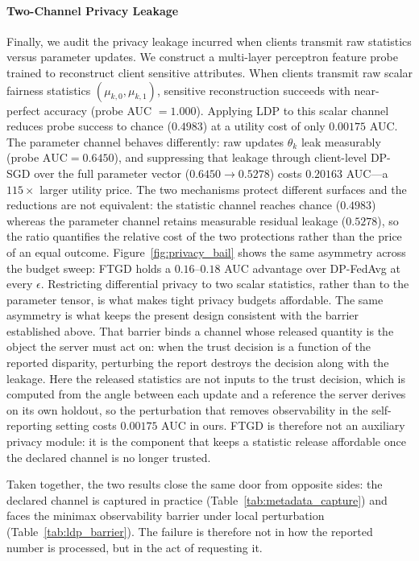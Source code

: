 \paragraph{Two-Channel Privacy Leakage}
Finally, we audit the privacy leakage incurred when clients transmit raw statistics versus parameter updates. We construct a multi-layer perceptron feature probe trained to reconstruct client sensitive attributes. When clients transmit raw scalar fairness statistics $(\mu_{k,0}, \mu_{k,1})$, sensitive reconstruction succeeds with near-perfect accuracy (probe AUC $= 1.000$). Applying LDP to this scalar channel reduces probe success to chance ($0.4983$) at a utility cost of only $0.00175$ AUC. The parameter channel behaves differently: raw updates $\theta_k$ leak measurably (probe $\mathrm{AUC} = 0.6450$), and suppressing that leakage through client-level DP-SGD over the full parameter vector ($0.6450 \to 0.5278$) costs $0.20163$ AUC---a $115\times$ larger utility price. The two mechanisms protect different surfaces and the reductions are not equivalent: the statistic channel reaches chance ($0.4983$) whereas the parameter channel retains measurable residual leakage ($0.5278$), so the ratio quantifies the relative cost of the two protections rather than the price of an equal outcome. Figure~\ref{fig:privacy_bail} shows the same asymmetry across the budget sweep: FTGD holds a $0.16$--$0.18$ AUC advantage over DP-FedAvg at every $\epsilon$. Restricting differential privacy to two scalar statistics, rather than to the parameter tensor, is what makes tight privacy budgets affordable. The same asymmetry is what keeps the present design consistent with the barrier established above. That barrier binds a channel whose released quantity is the object the server must act on: when the trust decision is a function of the reported disparity, perturbing the report destroys the decision along with the leakage. Here the released statistics are not inputs to the trust decision, which is computed from the angle between each update and a reference the server derives on its own holdout, so the perturbation that removes observability in the self-reporting setting costs $0.00175$ AUC in ours. FTGD is therefore not an auxiliary privacy module: it is the component that keeps a statistic release affordable once the declared channel is no longer trusted.

Taken together, the two results close the same door from opposite sides: the declared channel is captured in practice (Table~\ref{tab:metadata_capture}) and faces the minimax observability barrier under local perturbation (Table~\ref{tab:ldp_barrier}). The failure is therefore not in how the reported number is processed, but in the act of requesting it.


